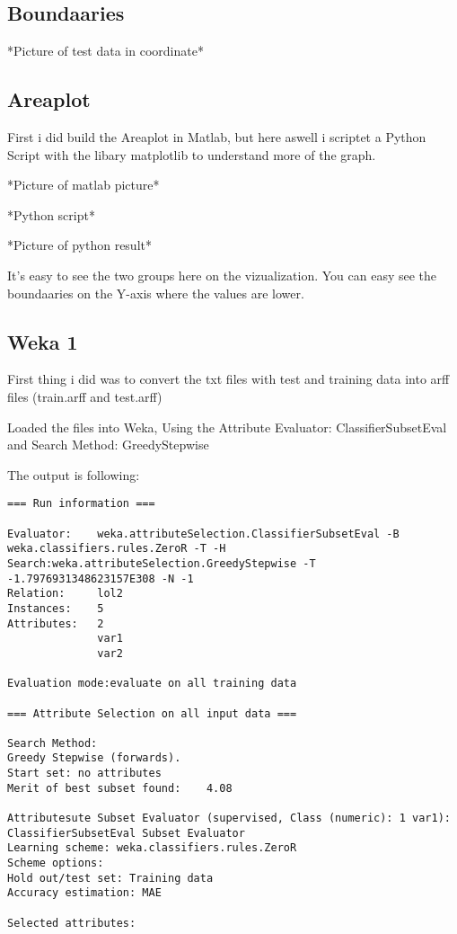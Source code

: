 \documentclass[a4paper,12pt,pdftex]{article}
\begin{document}
\subsection{Boundaaries}
*Picture of test data in coordinate*


\subsection{Areaplot}
First i did build the Areaplot in Matlab, but here aswell i scriptet a Python Script with the libary matplotlib to understand
more of the graph. 

*Picture of matlab picture*

*Python script*

*Picture of python result*

It's easy to see the two groups here on the vizualization. You can easy see the boundaaries on the Y-axis where the values are lower.

\subsection{Weka 1}
First thing i did was to convert the txt files with test and training data into arff files (train.arff and test.arff)

Loaded the files into Weka,
Using the Attribute Evaluator: ClassifierSubsetEval and Search Method: GreedyStepwise

The output is following:
\begin{lstlisting}[frame=single]
=== Run information ===

Evaluator:    weka.attributeSelection.ClassifierSubsetEval -B weka.classifiers.rules.ZeroR -T -H
Search:weka.attributeSelection.GreedyStepwise -T -1.7976931348623157E308 -N -1
Relation:     lol2
Instances:    5
Attributes:   2
              var1
              var2
              
Evaluation mode:evaluate on all training data

=== Attribute Selection on all input data ===

Search Method:
Greedy Stepwise (forwards).
Start set: no attributes
Merit of best subset found:    4.08 

Attributesute Subset Evaluator (supervised, Class (numeric): 1 var1):
ClassifierSubsetEval Subset Evaluator
Learning scheme: weka.classifiers.rules.ZeroR
Scheme options: 
Hold out/test set: Training data
Accuracy estimation: MAE

Selected attributes: 
\end{lstlisting}
\end{document}
